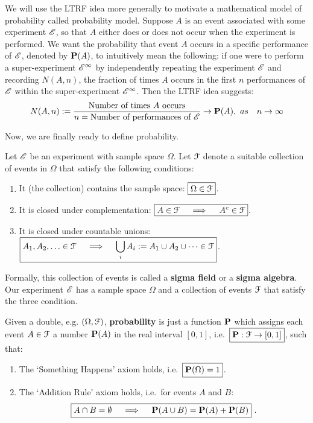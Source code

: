 We will use the LTRF idea more generally to motivate a mathematical model of probability called probability model.  Suppose $A$ is an event associated with some experiment $\mathscr{E}$, so that $A$ either does or does not occur when the experiment is performed.  We want the probability that event $A$ occurs in a specific performance of $\mathscr{E}$, denoted by $\mathbf{P}(A)$, to intuitively mean the following:  if one were to perform a super-experiment $\mathscr{E}^{\infty}$ by independently repeating the experiment $\mathscr{E}$ and recording $N(A,n)$, the fraction of times $A$ occurs in the first $n$ performances of $\mathscr{E}$ within the super-experiment $\mathscr{E}^{\infty}$. Then the LTRF idea suggests:
\begin{equation}\label{E:NofAn}
N(A,n) :=  \frac{\text{Number of times $A$ occurs}}{n=\text{Number of performances of $\mathscr{E}$}} \to \mathbf{P}(A), \ as \quad  n \to \infty
\end{equation}

Now, we are finally ready to define probability.
\begin{definition}[Probability]\label{D:Prob}
Let $\mathscr{E}$ be an experiment with sample space $\Omega$.  Let $\mathcal{F}$ denote a suitable collection of events in $\Omega$ that satisfy the following conditions:
\begin{enumerate}
\item It (the collection) contains the sample space:
$\boxed{
\Omega \in \mathcal{F} }$.
\item It is closed under complementation:
$\boxed{
A \in \mathcal{F} \quad \implies \quad A^c \in \mathcal{F} }$.
\item It is closed under countable unions:
$\boxed{
A_1, A_2, \ldots \in \mathcal{F} \quad \implies \quad \bigcup_{i} {A_i} := A_1 \cup A_2 \cup \cdots \in \mathcal{F} }$.
\end{enumerate}
Formally, this collection of events is called a {\bf sigma field} or a {\bf sigma algebra}.  Our experiment $\mathscr{E}$ has a sample space $\Omega$ and a collection of events $\mathcal{F}$ that satisfy the three condition. 

Given a double, e.g. $(\Omega, \mathcal{F})$, {\bf probability} is just a function $\mathbf{P}$ which assigns each event $A \in \mathcal{F}$ a number $\mathbf{P}(A)$ in the real interval $[0,1]$, i.e.~$\boxed{\mathbf{P} : \mathcal{F} \to [0,1] }$, such that:
\begin{enumerate}
\item The `Something Happens' axiom holds, i.e.~$\boxed{\mathbf{P}(\Omega) = 1}$. 
\item The `Addition Rule' axiom holds, i.e.~for events $A$ and $B$:
$$
\boxed{
A \cap B = \emptyset \quad \implies \quad \mathbf{P}(A \cup B) = \mathbf{P}(A) + \mathbf{P}(B)
} \ .
$$
\end{enumerate}
\end{definition}
